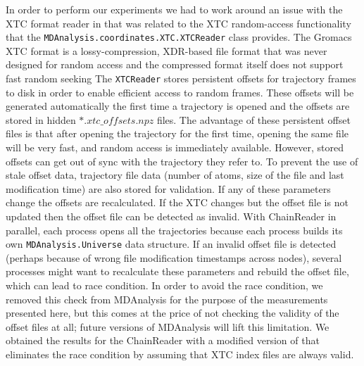In order to perform our experiments we had to work around an issue with the XTC format reader in  that was related to the XTC random-access functionality that the \texttt{MDAnalysis.coordinates.XTC.XTCReader} class provides.
The Gromacs XTC format \citep{Lindahl01, Spangberg:2011zr} is a lossy-compression, XDR-based file format that was never designed for random access and the compressed format itself does not support fast random seeking
The \texttt{XTCReader} stores persistent offsets for trajectory frames to disk \citep{Gowers:2016aa} in order to enable efficient access to random frames.
These offsets will be generated automatically the first time a trajectory is opened and the offsets are stored in hidden $\ast.xtc\_offsets.npz$ files. 
The advantage of these persistent offset files is that after opening the trajectory for the first time, opening the same file will be very fast, and random access is immediately available. 
However, stored offsets can get out of sync with the trajectory they refer to. 
To prevent the use of stale offset data, trajectory file data (number of atoms, size of the file and last modification time) are also stored for validation.
If any of these parameters change the offsets are recalculated. 
If the XTC changes but the offset file is not updated then the offset file can be detected as invalid.
With ChainReader in parallel, each process opens all the trajectories because each process builds its own \texttt{MDAnalysis.Universe} data structure.
If an invalid offset file is detected (perhaps because of wrong file modification timestamps across nodes), several processes might want to recalculate these parameters and rebuild the offset file, which can lead to race condition.
In order to avoid the race condition, we removed this check from MDAnalysis for the purpose of the measurements presented here, but this comes at the price of not checking the validity of the offset files at all; future versions of MDAnalysis will lift this limitation.  
We obtained the results for the ChainReader with a modified version of  that eliminates the race condition by assuming that XTC index files are always valid.

